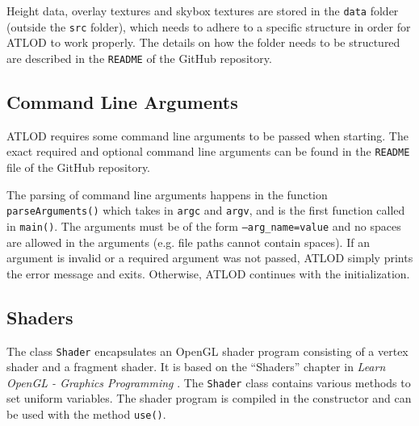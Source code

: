 Height data, overlay textures and skybox textures are stored in the \texttt{data} folder (outside the \texttt{src} folder),
which needs to adhere to a specific structure in order for 
ATLOD to work properly. The details on how the folder needs to be structured are described in the \texttt{README} of the GitHub repository.

\subsection{Command Line Arguments}
ATLOD requires some command line arguments to be passed 
when starting. The exact required and optional command line arguments
can be found in the \texttt{README} file of the GitHub repository.

The parsing of command line arguments happens in the function \texttt{parseArguments()}
which takes in \texttt{argc} and \texttt{argv}, and is the first function called in \texttt{main()}. 
The arguments must be of the form \texttt{--arg\_name=value}
and no spaces are allowed in the arguments (e.g. 
file paths cannot contain spaces).
If an argument is invalid or a required argument was not passed, 
ATLOD simply prints the error message and exits.
Otherwise, ATLOD continues with the initialization.

\subsection{Shaders}
The class \texttt{Shader} encapsulates an OpenGL shader program consisting of a vertex shader and a fragment shader.
It is based on the ``Shaders'' chapter in \textit{Learn OpenGL - Graphics Programming} \cite{learnopengl}.
The \texttt{Shader} class contains various methods to 
set uniform variables. The shader program is compiled in the constructor and can be 
used with the method \texttt{use()}.

